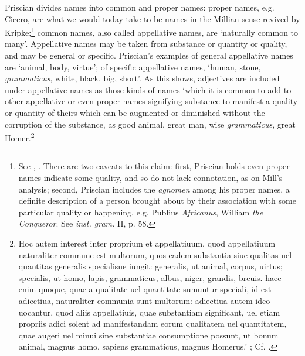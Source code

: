 \documentclass[]{article}
\begin{document}
Priscian divides names into common and proper names: proper names, e.g. Cicero, are what we would today take to be names in the Millian sense revived by Kripke;\footnote{See \cite{Mill1974}, \cite{Kripke1980}. There are two caveats to this claim: first, Priscian holds even proper names indicate some quality, and so do not lack connotation, as on Mill's analysis; second, Priscian includes the \textit{agnomen} among his proper names, a definite description of a person brought about by their association with some particular quality or happening, e.g. Publius  \textit{Africanus}, William \textit{the Conqueror}. See \textit{inst. gram.} II, p. 58.} common names, also called appellative names, are `naturally common to many'. Appellative names may be taken from substance or quantity or quality, and may be general or specific. Priscian's examples of general appellative names are `animal, body, virtue'; of specific appellative names, `human, stone, \textit{grammaticus}, white, black, big, short'. As this shows, adjectives are included under appellative names as those kinds of names `which it is common to add to other appellative or even proper names signifying substance to manifest a quality or quantity of theirs which can be augmented or diminished without the corruption of the substance, as good animal, great man, wise \textit{grammaticus}, great Homer.\footnote{Hoc autem interest inter proprium et appellatiuum, quod appellatiuum naturaliter commune est multorum, quos eadem substantia siue qualitas uel quantitas generalis specialisue iungit: generalis, ut animal, corpus, uirtus; specialis, ut homo, lapis, grammaticus, albus, niger, grandis, breuis. haec enim quoque, quae a qualitate uel quantitate sumuntur speciali, id est adiectiua, naturaliter communia sunt multorum: adiectiua autem ideo uocantur, quod aliis appellatiuis, quae substantiam significant, uel etiam propriis adici solent ad manifestandam eorum qualitatem uel quantitatem, quae augeri uel minui sine substantiae consumptione possunt, ut bonum animal, magnus homo, sapiens grammaticus, magnus Homerus.' \cite[\textit{inst. gram.} II, p. 58]{inst.gram.}; Cf. \cite[pp. 212-213]{Henry1974}.}
\end{document}
